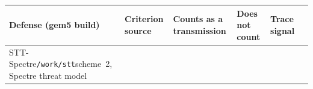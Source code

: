 {%
%
%
%
%
%
\def\xcwA{76pt}%
\def\xcwB{93pt}%
\def\xcwC{87pt}%
\def\xcwD{89pt}%
\def\xcwE{92pt}%
\def\xcwF{54pt}%
\setlength{\tabcolsep}{2.5pt}%
\def\xcRowGap{3.2pt}%
\footnotesize%
\renewcommand{\arraystretch}{1.0}%
\setlength{\aboverulesep}{0pt}\setlength{\belowrulesep}{0pt}%
\def\xs#1{\texttt{#1}}%
\def\xpad{\rule{0pt}{9.4pt}}%
\def\xbot{\rule[-\xcRowGap]{0pt}{0pt}}%
\def\xgray{\cellcolor{sssrcbg}}%
%
\begin{tabular}{@{}%
  >{\raggedright\arraybackslash}p{\xcwA}%
  >{\raggedright\arraybackslash}p{\xcwB}%
  >{\raggedright\arraybackslash}p{\xcwC}%
  >{\raggedright\arraybackslash}p{\xcwD}%
  >{\raggedright\arraybackslash}p{\xcwE}%
  >{\raggedright\arraybackslash}p{\xcwF}@{}}%
\toprule%
\xpad Defense (gem5 build) & Criterion source & \cellcolor{ssxmitfill}Counts as a transmission & Does not count & Trace signal & \multicolumn{1}{>{\columncolor{ssspecfill}[\tabcolsep][0pt]\raggedright\arraybackslash}p{\xcwF}@{}}{Window\xbot}\\%
\midrule%
\xpad STT-Spectre\newline \xs{/work/stt}\newline scheme~2, Spectre threat model%

\end{tabular}}
